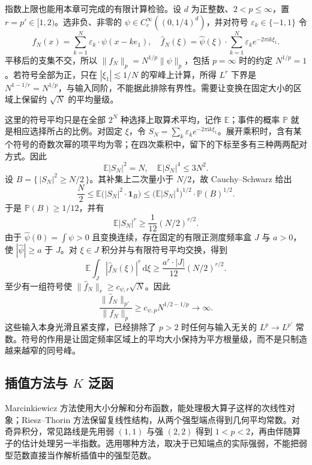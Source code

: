 \ProseParagraphBreak

指数上限也能用本章可完成的有限计算检验。设 \(d\) 为正整数、\(2<p\leq\infty\)，置 \(r=p'\in[1,2)\)。选非负、非零的 \(\psi\in C_c^\infty((0,1/4)^d)\)，并对符号 \(\varepsilon_k\in\{-1,1\}\) 令
\[
 f_N(x)=\sum_{k=1}^N\varepsilon_k\cdot\psi(x-ke_1),
 \quad
 \widehat f_N(\xi)=\widehat\psi(\xi)\cdot
 \sum_{k=1}^N\varepsilon_k e^{-2\pi\mathrm ik\xi_1}.
\]
平移后的支集不交，所以
\(\|f_N\|_p=N^{1/p}\|\psi\|_p\)，包括 \(p=\infty\) 时的约定 \(N^{1/p}=1\)。若符号全部为正，只在 \(|\xi_1|\lesssim1/N\) 的窄峰上计算，所得 \(L^r\) 下界是 \(N^{1-1/r}=N^{1/p}\)，与输入同阶，不能据此排除有界性。需要让变换在固定大小的区域上保留约 \(\sqrt N\) 的平均量级。

\ProseParagraphBreak

这里的符号平均只是在全部 \(2^N\) 种选择上取算术平均，记作 \(\mathbb E\)；事件的概率 \(\mathbb P\) 就是相应选择所占的比例。对固定 \(\xi\)，令 \(S_N=\sum_k\varepsilon_k e^{-2\pi\mathrm ik\xi_1}\)。展开乘积时，含有某个符号的奇数次幂的项平均为零；在四次乘积中，留下的下标至多有三种两两配对方式。因此
\[
 \mathbb E|S_N|^2=N,
 \quad \mathbb E|S_N|^4\leq3N^2.
\]
设 \(B=\{\,|S_N|^2\geq N/2\,\}\)。其补集上二次量小于 \(N/2\)，故 Cauchy--Schwarz 给出
\[
 \frac N2\leq\mathbb E\bigl(|S_N|^2\cdot\mathbf1_B\bigr)
 \leq\bigl(\mathbb E|S_N|^4\bigr)^{1/2}\cdot\mathbb P(B)^{1/2}.
\]
于是 \(\mathbb P(B)\geq1/12\)，并有
\[
 \mathbb E|S_N|^r\geq\frac1{12}(N/2)^{r/2}.
\]
由于 \(\widehat\psi(0)=\int\psi>0\) 且变换连续，存在固定的有限正测度频率盒 \(J\) 与 \(a>0\)，使 \(|\widehat\psi|\geq a\) 于 \(J\)。对 \(\xi\in J\) 积分并与有限符号平均交换，得到
\[
 \mathbb E\int_J|\widehat f_N(\xi)|^r\,\mathrm d\xi
 \geq\frac{a^r\cdot|J|}{12}(N/2)^{r/2}.
\]
至少有一组符号使 \(\|\widehat f_N\|_r\geq c_{\psi,r}\sqrt N\)。因此
\[
 \frac{\|\widehat f_N\|_{p'}}{\|f_N\|_p}
 \geq c_{\psi,p}N^{1/2-1/p}\longrightarrow\infty.
\]
这些输入本身光滑且紧支撑，已经排除了 \(p>2\) 时任何与输入无关的 \(L^p\rightarrow L^{p'}\) 常数。符号的作用是让固定频率区域上的平均大小保持为平方根量级，而不是只制造越来越窄的同号峰。

\subsection{插值方法与 \texorpdfstring{\(K\)}{K} 泛函}
\label{b2:subsec:170404}

Marcinkiewicz 方法使用大小分解和分布函数，能处理极大算子这样的次线性对象；Riesz--Thorin 方法保留复线性结构，从两个强型端点得到几何平均常数。对奇异积分，常见路线是先用弱 \((1,1)\) 与强 \((2,2)\) 得到 \(1<p<2\)，再由伴随算子的估计处理另一半指数。选用哪种方法，取决于已知端点的实际强弱，不能把弱型范数直接当作解析插值中的强型范数。

